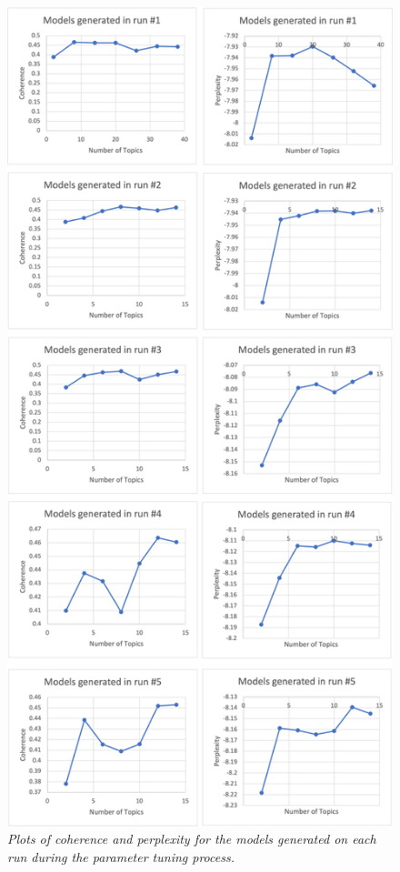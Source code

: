 \documentclass[twoside,12pt,a4paper]{article}
\begin{document}
\begin{figure}[h]
\centering
\includegraphics[scale=0.5]{charts_models.png}
\caption{\textit{Plots of coherence and perplexity for the models generated on each run during the parameter tuning process.}}
\label{fig:charts_models}
\end{figure}
\end{document}
